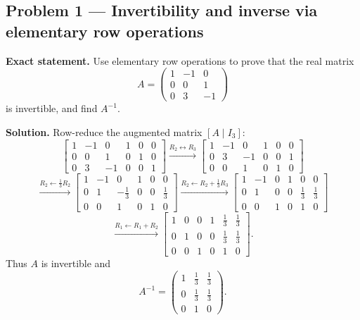 \documentclass[12pt,a4paper]{article}
\theoremstyle{plain}
\theoremstyle{definition}      %
\begin{document}
\subsection*{Problem 1 — Invertibility and inverse via elementary row operations}

\textbf{Exact statement.}
Use elementary row operations to prove that the real matrix
\[
A=\begin{pmatrix}
	1&-1&0\\
	0&0&1\\
	0&3&-1
\end{pmatrix}
\]
is invertible, and find \(A^{-1}\).

\textbf{Solution.}
Row-reduce the augmented matrix \([A\mid I_3]\):
\[
\left[\begin{array}{ccc|ccc}
	1&-1&0&1&0&0\\
	0&0&1&0&1&0\\
	0&3&-1&0&0&1
\end{array}\right]
\overset{R_2\leftrightarrow R_3}{\longrightarrow}
\left[\begin{array}{ccc|ccc}
	1&-1&0&1&0&0\\
	0&3&-1&0&0&1\\
	0&0&1&0&1&0
\end{array}\right]
\]
\[
\overset{R_2\leftarrow \frac13 R_2}{\longrightarrow}
\left[\begin{array}{ccc|ccc}
	1&-1&0&1&0&0\\
	0&1&-\frac13&0&0&\frac13\\
	0&0&1&0&1&0
\end{array}\right]
\overset{R_2\leftarrow R_2+\frac13 R_3}{\longrightarrow}
\left[\begin{array}{ccc|ccc}
	1&-1&0&1&0&0\\
	0&1&0&0&\frac13&\frac13\\
	0&0&1&0&1&0
\end{array}\right]
\]
\[
\overset{R_1\leftarrow R_1+R_2}{\longrightarrow}
\left[\begin{array}{ccc|ccc}
	1&0&0&1&\frac13&\frac13\\
	0&1&0&0&\frac13&\frac13\\
	0&0&1&0&1&0
\end{array}\right].
\]
Thus \(A\) is invertible and
\[
A^{-1}=\begin{pmatrix}
	1&\frac13&\frac13\\
	0&\frac13&\frac13\\
	0&1&0
\end{pmatrix}.
\]
\end{document}
